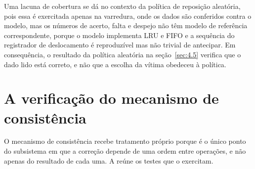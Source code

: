 Uma lacuna de cobertura se dá no contexto da política de reposição aleatória, pois essa é exercitada apenas na varredura, onde os dados são conferidos contra o modelo, mas os números de acerto, falta e despejo não têm modelo de referência correspondente, porque o modelo implementa LRU e FIFO e a sequência do registrador de deslocamento é reproduzível mas não trivial de antecipar. Em consequência, o resultado da política aleatória na seção~\ref{sec:4.5} verifica que o dado lido está correto, e não que a escolha da vítima obedeceu à política.

\section{A verificação do mecanismo de consistência}\label{sec:4.3}

O mecanismo de consistência recebe tratamento próprio porque é o único ponto do subsistema em que a correção depende de uma ordem entre operações, e não apenas do resultado de cada uma. A  reúne os testes que o exercitam.

